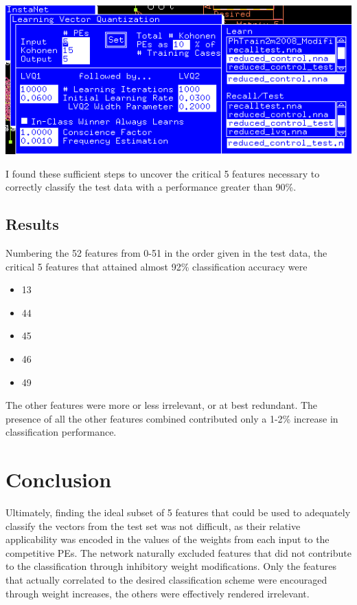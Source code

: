 \documentclass[12pt]{article}
\begin{document}
\begin{center}
\includegraphics[scale=0.7]{parameters5control.png}
\end{center}

I found these sufficient steps to uncover the critical 5 features necessary to correctly classify the test data with a performance greater than 90\%.  

\subsection{Results}

Numbering the 52 features from 0-51 in the order given in the test data, the critical 5 features that attained almost 92\% classification accuracy were

\begin{itemize}
\item 13
\item 44
\item 45
\item 46
\item 49
\end{itemize}

The other features were more or less irrelevant, or at best redundant.  The presence of all the other features combined contributed only a 1-2\% increase in classification performance.

\section{Conclusion}

Ultimately, finding the ideal subset of 5 features that could be used to adequately classify the vectors from the test set was not difficult, as their relative applicability was encoded in the values of the weights from each input to the competitive PEs.  The network naturally excluded features that did not contribute to the classification through inhibitory weight modifications.  Only the features that actually correlated to the desired classification scheme were encouraged through weight increases, the others were effectively rendered irrelevant.  
\end{document}
